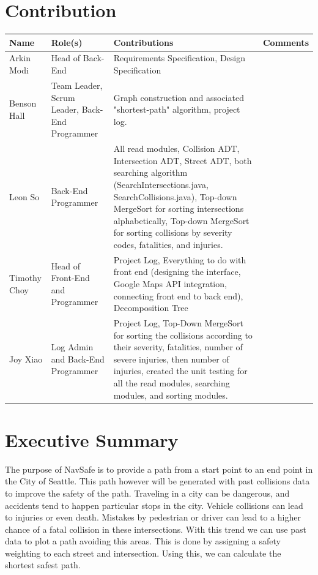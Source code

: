 \documentclass[12pt]{article}
\begin{document}
\section{Contribution}
\begin{tabular}{|P{2.5cm}|P{4cm}|P{5cm}|P{3.5cm}|}
    \hline
    \textbf{Name} & \textbf{Role(s)} & \textbf{Contributions} & \textbf{Comments}\\
    \hline
    Arkin Modi & Head of Back-End & Requirements Specification, Design Specification & ~\\
    \hline
    Benson Hall & Team Leader, Scrum Leader, Back-End Programmer & Graph construction and associated "shortest-path" algorithm, project log. %
    & ~\\
    \hline
    Leon So & Back-End Programmer & All read modules, Collision ADT, Intersection ADT, Street ADT, both searching algorithm (SearchIntersections.java, SearchCollisions.java), Top-down MergeSort for sorting intersections alphabetically, Top-down MergeSort for sorting collisions by severity codes, fatalities, and injuries. & ~\\
    \hline
    Timothy Choy & Head of Front-End and Programmer & Project Log, Everything to do with front end (designing the interface, Google Maps API integration, connecting front end to back end), Decomposition Tree & ~\\
    \hline
    Joy Xiao & Log Admin and Back-End Programmer & Project Log, Top-Down MergeSort for sorting the collisions according to their severity, fatalities, number of severe injuries, then number of injuries, created the unit testing for all the read modules, searching modules, and sorting modules. &~\\
    \hline
\end{tabular}
\newpage

\section{Executive Summary}
The purpose of NavSafe is to provide a path from a start point to an end point in the City of Seattle. This path however will be generated with past collisions data to improve the safety of the path. Traveling in a city can be dangerous, and accidents tend to happen particular stops in the city. Vehicle collisions can lead to injuries or even death. Mistakes by pedestrian or driver can lead to a higher chance of a fatal collision in these intersections. With this trend we can use past data to plot a path avoiding this areas. This is done by assigning a safety weighting to each street and intersection. Using this, we can calculate the shortest safest path.
\end{document}
